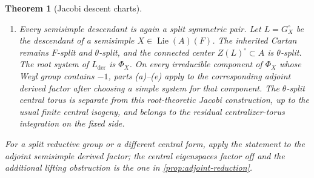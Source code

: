 \documentclass[11pt]{amsart}
\newtheorem{theorem}{Theorem}[section]
\theoremstyle{definition}
\theoremstyle{remark}
\newcommand{\A}{\mathbb A}
\newcommand{\Lie}{\operatorname{Lie}}
\newcommand{\Ad}{\operatorname{Ad}}
\begin{document}
\begin{theorem}[Jacobi descent charts]
\begin{enumerate}[label=\textup{(\alph*)},leftmargin=2.3em]
      \[
       \Ad(u_\xi^{-1})Y_\xi=Q
\]
      Although neither the twisted cover nor $u_\xi$ is asserted to extend
      across $q=0$, the inverse-conjugated expression is the pullback of the
      polynomial family $Q(q)$ on $\A^\Delta$ and therefore has the canonical
      continuation $Q(0)$, a principal nilpotent element.
\item Every semisimple descendant is again a split symmetric pair.  Let
      $L=G_X^\circ$ be the descendant of a semisimple
      $X\in\Lie(A)(F)$.  The inherited Cartan remains $F$-split and
      $\theta$-split, and the connected center $Z(L)^\circ\subset A$ is
      $\theta$-split.  The root system of $L_{\mathrm{der}}$ is
      $\Phi_X$.  On every irreducible component of $\Phi_X$ whose Weyl group
      contains $-1$, parts \textup{(a)}--\textup{(e)} apply to the
      corresponding adjoint derived factor after choosing a simple system
      for that component.  The $\theta$-split central torus is separate from this root-theoretic
      Jacobi construction, up to the usual finite central isogeny, and belongs to
      the residual centralizer-torus
      integration on the fixed side.
\end{enumerate}
For a split reductive group or a different central form, apply the statement
to the adjoint semisimple derived factor; the central eigenspaces factor off
and the additional lifting obstruction is the one in
\cref{prop:adjoint-reduction}.
\end{theorem}
\end{document}

